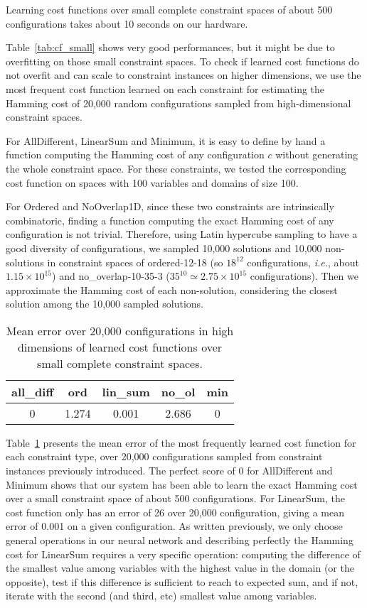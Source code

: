 \documentclass{article}
\newcommand{\ie}{\textit{i.e.}}
\begin{document}
Learning cost functions over small complete constraint spaces of about
500 configurations takes about 10 seconds on our hardware.

Table~\ref{tab:cf_small} shows very good performances, but it might be
due  to overfitting  on those  small constraint  spaces.  To  check if
learned  cost functions  do not  overfit and  can scale  to constraint
instances on higher dimensions, we use the most frequent cost function
learned on each  constraint for estimating the Hamming  cost of 20,000
random configurations sampled from high-dimensional constraint spaces.

For AllDifferent, LinearSum and Minimum, it  is easy to define by hand
a function computing the Hamming cost of any configuration $c$ without
generating  the  whole constraint  space.  For  these constraints,  we
tested the  corresponding cost function  on spaces with  100 variables
and domains of size 100.

For  Ordered   and  NoOverlap1D,  since  these   two  constraints  are
intrinsically  combinatoric, finding  a function  computing the  exact
Hamming cost  of any configuration  is not trivial.   Therefore, using
Latin hypercube sampling  to have a good  diversity of configurations,
we  sampled 10,000  solutions and  10,000 non-solutions  in constraint
spaces  of  ordered-12-18  (so $18^{12}$  configurations,  \ie,  about
$1.15\times         10^{15}$)          and         no\_overlap-10-35-3
($35^{10}  \simeq   2.75\times  10^{15}$  configurations).    Then  we
approximate  the Hamming  cost of  each non-solution,  considering the
closest solution among the 10,000 sampled solutions.

\begin{table}
  \centering
\begin{tabular}{|c|c|c|c|c|}
  \hline
  all\_diff & ord & lin\_sum & no\_ol & min\\
  \hline
  0 & 1.274 & 0.001 & 2.686 & 0\\
  \hline
\end{tabular}
\caption{Mean error  over 20,000 configurations in  high dimensions of
  learned cost functions over small complete constraint spaces.}
\label{tab:cf_scale}
\end{table}

Table~\ref{tab:cf_scale} presents the mean error of the most frequently learned cost function for each constraint type, over 20,000 configurations sampled from constraint instances previously introduced. The perfect score of 0 for AllDifferent and Minimum shows that our system has been able to learn the exact Hamming cost over a small constraint space of about 500 configurations. For LinearSum, the cost function only has an error of 26 over 20,000 configuration, giving a mean error of 0.001 on a given configuration. As written previously, we only choose general operations in our neural network and describing perfectly the Hamming cost for LinearSum requires a very specific operation: computing the difference of the smallest value among variables with the highest value in the domain (or the opposite), test if this difference is sufficient to reach to expected sum, and if not, iterate with the second (and third, etc) smallest value among variables.
\end{document}
